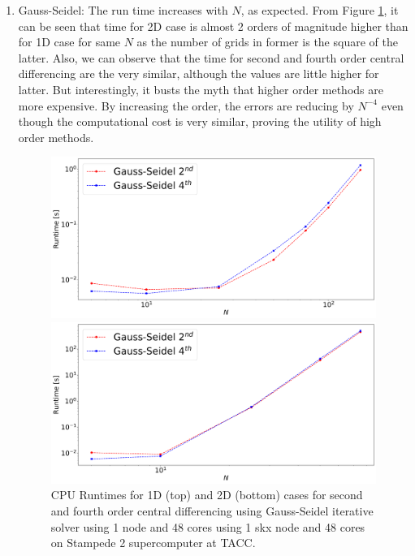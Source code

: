 \documentclass[12pt]{amsart}   %
\begin{document}
\begin{enumerate}
    \item Gauss-Seidel:
The run time increases with $N$, as expected. From Figure \ref{fig:runtimeGS}, it can be seen that time for 2D case is almost 2 orders of magnitude higher than for 1D case for same $N$ as the number of grids in former is the square of the latter. Also, we can observe that the time for second and fourth order central differencing are the very similar, although the values are little higher for latter. But interestingly, it busts the myth that higher order methods are more expensive. By increasing the order, the errors are reducing by $N^{-4}$ even though the computational cost is very similar, proving the utility of high order methods.

\begin{figure}[htbp!] 
\begin{minipage}[]{\linewidth}
  \centering
    \includegraphics[width=\linewidth,keepaspectratio]{Project1photos/runtime_GS_1D.png}
\end{minipage}
\begin{minipage}[htbp!]{\linewidth}
  \centering
    \includegraphics[width=\linewidth,keepaspectratio, trim = 0cm 0cm 0cm 0cm,clip]{Project1photos/runtime_GS_2D.png}
\end{minipage}
\caption{CPU Runtimes for 1D (top) and 2D (bottom) cases for second and fourth order central differencing using Gauss-Seidel iterative solver using 1 node and 48 cores using 1 skx node and 48 cores on Stampede 2 supercomputer at TACC.} \label{fig:runtimeGS}
\end{figure}
\end{enumerate}
\end{document}
